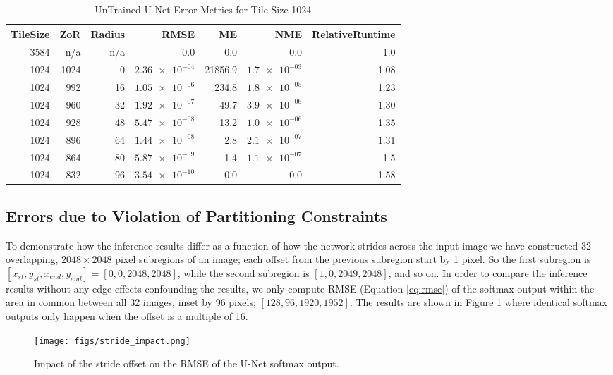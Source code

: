 \documentclass[runningheads]{llncs}
\begin{document}
\begin{table}[h!]
	\centering
\caption{UnTrained U-Net Error Metrics for Tile Size 1024}
\label{tab:tile_size_1024}
\begin{tabular}{r|r|r|r|r|r|r}
	TileSize & ZoR & Radius & RMSE    & ME & NME & RelativeRuntime \\ 
	\hline
3584 & n/a & n/a & 0.0 & 0.0 & 0.0 & 1.0 \\
1024 & 1024 & 0 & $\num{2.36e-04}$ & 21856.9 & $\num{1.7e-03}$ & 1.08 \\
1024 & 992 & 16 & $\num{1.05e-06}$ & 234.8 & $\num{1.8e-05}$ & 1.23 \\
1024 & 960 & 32 & $\num{1.92e-07}$ & 49.7 & $\num{3.9e-06}$ & 1.30 \\
1024 & 928 & 48 & $\num{5.47e-08}$ & 13.2 & $\num{1.0e-06}$ & 1.35 \\
1024 & 896 & 64 & $\num{1.44e-08}$ & 2.8 & $\num{2.1e-07}$ & 1.31 \\
1024 & 864 & 80 & $\num{5.87e-09}$ & 1.4 & $\num{1.1e-07}$ & 1.5 \\
1024 & 832 & 96 & $\num{3.54e-10}$ & 0.0 & 0.0 & 1.58 \\
\end{tabular}
\end{table}


\subsection{Errors due to Violation of Partitioning Constraints}

To demonstrate how the inference results differ as a function of how the network strides across the input image we have constructed 32 overlapping, $2048 \times 2048$ pixel subregions of an image; each offset from the previous subregion start by 1 pixel. So the first subregion is $[x_{st}, y_{st}, x_{end}, y_{end}] = [0, 0, 2048, 2048]$, while the second subregion is $[1, 0, 2049, 2048]$, and so on. In order to compare the inference results without any edge effects confounding the results, we only compute RMSE (Equation \ref{eq:rmse}) of the softmax output within the area in common between all 32 images, inset by 96 pixels; $[128, 96, 1920, 1952]$. The results are shown in Figure \ref{fig:stride-impact} where identical softmax outputs only happen when the offset is a multiple of 16.

\begin{figure}[h!]
		\centering
		\texttt{[image: figs/stride\_impact.png]}

	\caption{Impact of the stride offset on the RMSE of the U-Net softmax output.}
	\label{fig:stride-impact}
\end{figure} 
\end{document}

